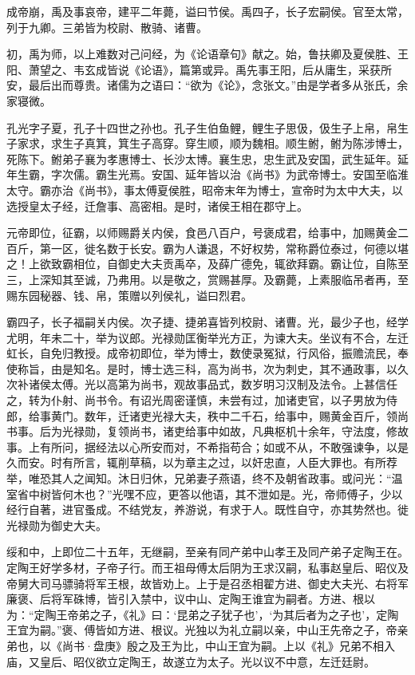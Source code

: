 \documentclass[12pt,UTF8]{ctexbook}
\begin{document}
成帝崩，禹及事哀帝，建平二年薨，谥曰节侯。禹四子，长子宏嗣侯。官至太常，列于九卿。三弟皆为校尉、散骑、诸曹。



初，禹为师，以上难数对己问经，为《论语章句》献之。始，鲁扶卿及夏侯胜、王阳、萧望之、韦玄成皆说《论语》，篇第或异。禹先事王阳，后从庸生，采获所安，最后出而尊贵。诸儒为之语曰：“欲为《论》，念张文。”由是学者多从张氏，余家寝微。



孔光字子夏，孔子十四世之孙也。孔子生伯鱼鲤，鲤生子思伋，伋生子上帛，帛生子家求，求生子真箕，箕生子高穿。穿生顺，顺为魏相。顺生鲋，鲋为陈涉博士，死陈下。鲋弟子襄为孝惠博士、长沙太博。襄生忠，忠生武及安国，武生延年。延年生霸，字次儒。霸生光焉。安国、延年皆以治《尚书》为武帝博士。安国至临淮太守。霸亦治《尚书》，事太傅夏侯胜，昭帝末年为博士，宣帝时为太中大夫，以选授皇太子经，迁詹事、高密相。是时，诸侯王相在郡守上。



元帝即位，征霸，以师赐爵关内侯，食邑八百户，号褒成君，给事中，加赐黄金二百斤，第一区，徙名数于长安。霸为人谦退，不好权势，常称爵位泰过，何德以堪之！上欲致霸相位，自御史大夫贡禹卒，及薛广德免，辄欲拜霸。霸让位，自陈至三，上深知其至诚，乃弗用。以是敬之，赏赐甚厚。及霸薨，上素服临吊者再，至赐东园秘器、钱、帛，策赠以列侯礼，谥曰烈君。



霸四子，长子福嗣关内侯。次子捷、捷弟喜皆列校尉、诸曹。光，最少子也，经学尤明，年未二十，举为议郎。光禄勋匡衡举光方正，为谏大夫。坐议有不合，左迁虹长，自免归教授。成帝初即位，举为博士，数使录冤狱，行风俗，振赡流民，奉使称旨，由是知名。是时，博士选三科，高为尚书，次为刺史，其不通政事，以久次补诸侯太傅。光以高第为尚书，观故事品式，数岁明习汉制及法令。上甚信任之，转为仆射、尚书令。有诏光周密谨慎，未尝有过，加诸吏官，以子男放为侍郎，给事黄门。数年，迁诸吏光禄大夫，秩中二千石，给事中，赐黄金百斤，领尚书事。后为光禄勋，复领尚书，诸吏给事中如故，凡典枢机十余年，守法度，修故事。上有所问，据经法以心所安而对，不希指苟合；如或不从，不敢强谏争，以是久而安。时有所言，辄削草稿，以为章主之过，以奸忠直，人臣大罪也。有所荐举，唯恐其人之闻知。沐日归休，兄弟妻子燕语，终不及朝省政事。或问光：“温室省中树皆何木也？”光嘿不应，更答以他语，其不泄如是。光，帝师傅子，少以经行自著，进官蚤成。不结党友，养游说，有求于人。既性自守，亦其势然也。徙光禄勋为御史大夫。



绥和中，上即位二十五年，无继嗣，至亲有同产弟中山孝王及同产弟子定陶王在。定陶王好学多材，子帝子行。而王祖母傅太后阴为王求汉嗣，私事赵皇后、昭仪及帝舅大司马骠骑将军王根，故皆劝上。上于是召丞相翟方进、御史大夫光、右将军廉褒、后将军硃博，皆引入禁中，议中山、定陶王谁宜为嗣者。方进、根以为：“定陶王帝弟之子，《礼》曰：‘昆弟之子犹子也’，‘为其后者为之子也’，定陶王宜为嗣。”褒、傅皆如方进、根议。光独以为礼立嗣以亲，中山王先帝之子，帝亲弟也，以《尚书·盘庚》殷之及王为比，中山王宜为嗣。上以《礼》兄弟不相入庙，又皇后、昭仪欲立定陶王，故遂立为太子。光以议不中意，左迁廷尉。
\end{document}
